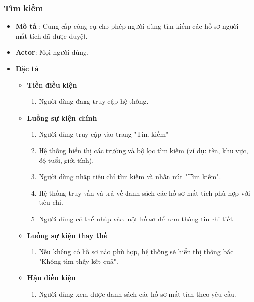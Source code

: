 \documentclass[../DoAn.tex]{subfiles}
\begin{document}
\subsubsection{Tìm kiếm}
\begin{itemize}
	\item \textbf{Mô tả} : Cung cấp công cụ cho phép người dùng tìm kiếm các hồ sơ người mất tích đã được duyệt.
	\item \textbf{Actor}: Mọi người dùng.
	\item \textbf{Đặc tả}
	      \begin{itemize}
		      \item \textbf{Tiền điều kiện}
		            \begin{enumerate}
			            \item Người dùng đang truy cập hệ thống.
		            \end{enumerate}
		      \item \textbf{Luồng sự kiện chính}
		            \begin{enumerate}
			            \item Người dùng truy cập vào trang "Tìm kiếm".
			            \item Hệ thống hiển thị các trường và bộ lọc tìm kiếm (ví dụ: tên, khu vực, độ tuổi, giới tính).
			            \item Người dùng nhập tiêu chí tìm kiếm và nhấn nút "Tìm kiếm".
			            \item Hệ thống truy vấn và trả về danh sách các hồ sơ mất tích phù hợp với tiêu chí.
			            \item Người dùng có thể nhấp vào một hồ sơ để xem thông tin chi tiết.
		            \end{enumerate}
		      \item \textbf{Luồng sự kiện thay thế}
		            \begin{enumerate}
			            \item Nếu không có hồ sơ nào phù hợp, hệ thống sẽ hiển thị thông báo "Không tìm thấy kết quả".
		            \end{enumerate}
		      \item \textbf{Hậu điều kiện}
		            \begin{enumerate}
			            \item Người dùng xem được danh sách các hồ sơ mất tích theo yêu cầu.
		            \end{enumerate}
	      \end{itemize}
\end{itemize}
\end{document}
